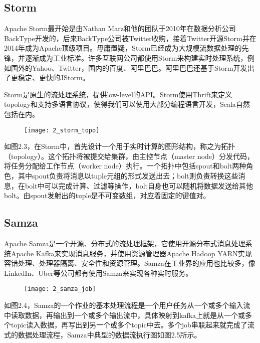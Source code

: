 \subsection{Storm}

Apache Storm\citep{storm}最开始是由Nathan Marz和他的团队于2010年在数据分析公司BackType开发的，后来BackType公司被Twitter收购，接着Twitter开源Storm并在2014年成为Apache顶级项目。毋庸置疑，Storm已经成为大规模流数据处理的先锋，并逐渐成为工业标准。许多互联网公司都使用Storm来构建实时处理系统，例如国外的Yahoo、Twitter，国内的百度、阿里巴巴。阿里巴巴还基于Storm开发出了更稳定、更快的JStorm\citep{jstorm}。

Storm是原生的流处理系统，提供low-level的API。Storm使用Thrift来定义topology和支持多语言协议，使得我们可以使用大部分编程语言开发，Scala自然包括在内。

\begin{figure}[!htbp]
    \centering
    \texttt{[image: 2\_storm\_topo]}
    \label{fig:2_storm_topo}
\end{figure}

如图2.3，在Storm中，首先设计一个用于实时计算的图形结构，称之为拓扑（topology）。这个拓扑将被提交给集群，由主控节点（master node）分发代码，将任务分配给工作节点（worker node）执行。一个拓扑中包括spout和bolt两种角色，其中spout负责将消息以tuple元组的形式发送出去；bolt则负责转换这些消息，在bolt中可以完成计算、过滤等操作，bolt自身也可以随机将数据发送给其他bolt。由spout发射出的tuple是不可变数组，对应着固定的键值对。

\subsection{Samza}

Apache Samza\citep{samza}是一个开源、分布式的流处理框架，它使用开源分布式消息处理系统Apache Kafka来实现消息服务，并使用资源管理器Apache Hadoop YARN实现容错处理、处理器隔离、安全性和资源管理。Samza在工业界的应用也比较多，像LinkedIn、Uber等公司都有使用Samza来实现各种实时服务。

\begin{figure}[!htbp]
    \centering
    \texttt{[image: 2\_samza\_job]}
    \label{fig:2_samza_job}
\end{figure}

如图2.4，Samza的一个作业的基本处理流程是一个用户任务从一个或多个输入流中读取数据，再输出到一个或多个输出流中，具体映射到kafka上就是从一个或多个topic读入数据，再写出到另一个或多个topic中去。多个job串联起来就完成了流式的数据处理流程，Samza中典型的数据流执行图如图2.5所示。

